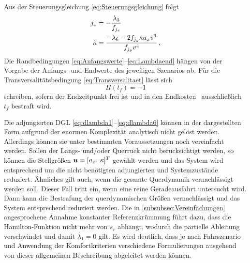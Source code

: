 Aus der Steuerungsgleichung \eqref{eq:Steuerungsgleichung} folgt 
\begin{align}
j_x &= -\frac{\lambda_3}{f_{j_x}}  \label{eq:jx} \\
\dot{\kappa} &= \frac{-\lambda_6-2f_{j_y} \kappa a_xv^3}{f_{j_y} v^4} \label{eq:dkappa}\,,
\end{align}
Die Randbedingungen \eqref{eq:Anfangswerte}--\eqref{eq:Lambdaend} hängen von der Vorgabe der Anfangs- und Endwerte des jeweiligen Szenarios ab. Für die Transversalitätsbedingung \eqref{eq:Transversalitaet} lässt sich 
\begin{equation}
	H(t_f) = -1
\end{equation}
schreiben, sofern der Endzeitpunkt frei ist und in den Endkosten \Vofxoftf~ausschließlich $t_f$ bestraft wird.

Die adjungierten \gls{DGL} \eqref{eq:dlambda1}--\eqref{eq:dlambda6} können in der dargestellten Form aufgrund der enormen Komplexität analytisch nicht gelöst werden. Allerdings können sie unter bestimmten Voraussetzungen noch vereinfacht werden. Sollen der Längs- und/oder Querruck nicht berücksichtigt werden, so können die Stellgrößen $\boldsymbol{u} = [a_x,\,\kappa]^T$ gewählt werden und das System wird entsprechend um die nicht benötigten adjungierten und Systemzustände reduziert. Ähnliches gilt auch, wenn die gesamte Querdynamik vernachlässigt werden soll. Dieser Fall tritt ein, wenn eine reine Geradeausfahrt untersucht wird. Dann kann die Bestrafung der querdynamischen Größen vernachlässigt und das System entsprechend reduziert werden. Die in \ref{subsubsec:Vereinfachungen} angesprochene Annahme konstanter Referenzkrümmung führt dazu, dass die Hamilton-Funktion nicht mehr von $s_r$ abhängt, wodurch die partielle Ableitung verschwindet und damit $\dot{\lambda_1} = 0$ gilt. Es wird deutlich, dass je nach Fahrszenario und Anwendung der Komfortkriterien verschiedene Formulierungen ausgehend von dieser allgemeinen Beschreibung abgeleitet werden können.
